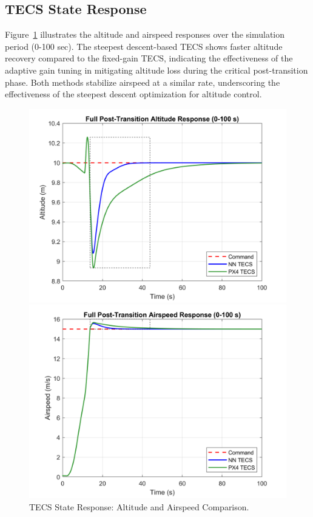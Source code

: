 \documentclass[journal,article,submit,pdftex,moreauthors]{Definitions/mdpi}
\begin{document}
\subsection{TECS State Response}
Figure~\ref{fig:tecs_state_response} illustrates the altitude and airspeed responses over the simulation period (0-100 sec). The steepest descent-based TECS shows faster altitude recovery compared to the fixed-gain TECS, indicating the effectiveness of the adaptive gain tuning in mitigating altitude loss during the critical post-transition phase. Both methods stabilize airspeed at a similar rate, underscoring the effectiveness of the steepest descent optimization for altitude control.


\begin{figure}[H]
    \centering
    \begin{minipage}{0.45\textwidth}
        \centering
        \includegraphics[width=\linewidth]{figures/full_altitude_plot.png}
    \end{minipage}
    \hfill
    \begin{minipage}{0.45\textwidth}
        \centering
        \includegraphics[width=\linewidth]{figures/full_airspeed_plot.png}
    \end{minipage}
    \caption{TECS State Response: Altitude and Airspeed Comparison.}
    \label{fig:tecs_state_response}
\end{figure}
\end{document}
